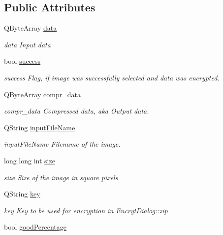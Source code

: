 \subsection*{Public Attributes}
\begin{DoxyCompactItemize}
\item 
Q\+Byte\+Array \mbox{\hyperlink{class_encrypt_dialog_acf3a8bbce90d99ef17fec093c35b1008}{data}}
\begin{DoxyCompactList}\small\item\em data Input data \end{DoxyCompactList}\item 
bool \mbox{\hyperlink{class_encrypt_dialog_ada4900bcd40894d9c098c65aa4066ac9}{success}}
\begin{DoxyCompactList}\small\item\em success Flag, if image was successfully selected and data was encrypted. \end{DoxyCompactList}\item 
Q\+Byte\+Array \mbox{\hyperlink{class_encrypt_dialog_a3e8998aa39696cbd1242f6420ef18143}{compr\+\_\+data}}
\begin{DoxyCompactList}\small\item\em compr\+\_\+data Compressed data, aka Output data. \end{DoxyCompactList}\item 
Q\+String \mbox{\hyperlink{class_encrypt_dialog_a859b1bc2f032a247632b879bf8663d0b}{input\+File\+Name}}
\begin{DoxyCompactList}\small\item\em input\+File\+Name Filename of the image. \end{DoxyCompactList}\item 
long long int \mbox{\hyperlink{class_encrypt_dialog_a7fff26f838ab50f807744cd2c4bed033}{size}}
\begin{DoxyCompactList}\small\item\em size Size of the image in square pixels \end{DoxyCompactList}\item 
Q\+String \mbox{\hyperlink{class_encrypt_dialog_a1afdef3c665fb0d0fae06d1df8e84951}{key}}
\begin{DoxyCompactList}\small\item\em key Key to be used for encryption in Encryt\+Dialog\+::zip \end{DoxyCompactList}\item 
bool \mbox{\hyperlink{class_encrypt_dialog_a0c821b893cfddd7a6c07bbd270ba49e9}{good\+Percentage}}

\end{DoxyCompactItemize}
